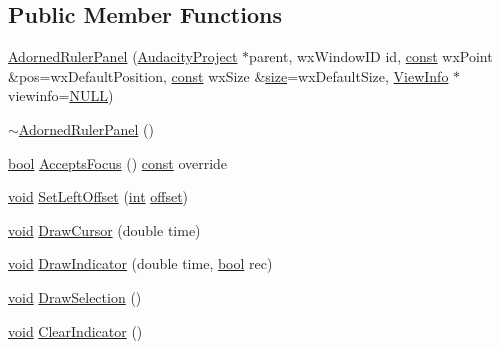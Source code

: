 \subsection*{Public Member Functions}
\begin{DoxyCompactItemize}
\item 
\hyperlink{class_adorned_ruler_panel_a79be876519d3846a69c54e1497502677}{Adorned\+Ruler\+Panel} (\hyperlink{class_audacity_project}{Audacity\+Project} $\ast$parent, wx\+Window\+ID id, \hyperlink{getopt1_8c_a2c212835823e3c54a8ab6d95c652660e}{const} wx\+Point \&pos=wx\+Default\+Position, \hyperlink{getopt1_8c_a2c212835823e3c54a8ab6d95c652660e}{const} wx\+Size \&\hyperlink{group__lavu__mem_ga854352f53b148adc24983a58a1866d66}{size}=wx\+Default\+Size, \hyperlink{class_view_info}{View\+Info} $\ast$viewinfo=\hyperlink{px__mixer_8h_a070d2ce7b6bb7e5c05602aa8c308d0c4}{N\+U\+LL})
\item 
\hyperlink{class_adorned_ruler_panel_ad5e6e4106b7459e4822d24bfbbed43e3}{$\sim$\+Adorned\+Ruler\+Panel} ()
\item 
\hyperlink{mac_2config_2i386_2lib-src_2libsoxr_2soxr-config_8h_abb452686968e48b67397da5f97445f5b}{bool} \hyperlink{class_adorned_ruler_panel_a9c167ec19d89e5021ed37dff2b8bdfb8}{Accepts\+Focus} () \hyperlink{getopt1_8c_a2c212835823e3c54a8ab6d95c652660e}{const}  override
\item 
\hyperlink{sound_8c_ae35f5844602719cf66324f4de2a658b3}{void} \hyperlink{class_adorned_ruler_panel_a85e7795d50f3d46fdc4cdd997f2fc504}{Set\+Left\+Offset} (\hyperlink{xmltok_8h_a5a0d4a5641ce434f1d23533f2b2e6653}{int} \hyperlink{layer12_8c_a33d71f23ba2052d17f0b754dc35265b0}{offset})
\item 
\hyperlink{sound_8c_ae35f5844602719cf66324f4de2a658b3}{void} \hyperlink{class_adorned_ruler_panel_a88db37689afaa4bf8311a9b79c6caf5d}{Draw\+Cursor} (double time)
\item 
\hyperlink{sound_8c_ae35f5844602719cf66324f4de2a658b3}{void} \hyperlink{class_adorned_ruler_panel_a85f502d7af3de69507aeb394177c12f6}{Draw\+Indicator} (double time, \hyperlink{mac_2config_2i386_2lib-src_2libsoxr_2soxr-config_8h_abb452686968e48b67397da5f97445f5b}{bool} rec)
\item 
\hyperlink{sound_8c_ae35f5844602719cf66324f4de2a658b3}{void} \hyperlink{class_adorned_ruler_panel_a898f63c541ddcc3c900096d03921f1b1}{Draw\+Selection} ()
\item 
\hyperlink{sound_8c_ae35f5844602719cf66324f4de2a658b3}{void} \hyperlink{class_adorned_ruler_panel_af657d63db45813bd346b0b45ac1c35d4}{Clear\+Indicator} ()

\end{DoxyCompactItemize}
